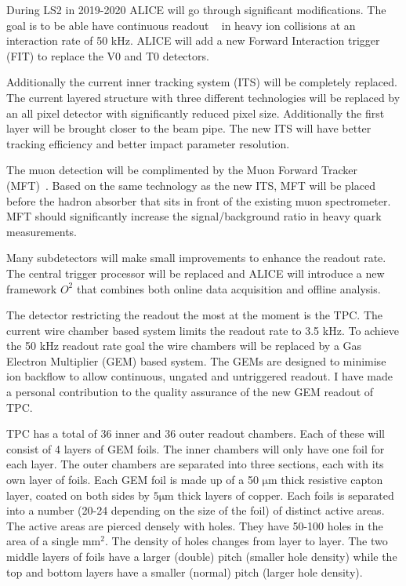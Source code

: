 During LS2 in 2019-2020 ALICE will go through significant modifications. The goal is to be able have continuous readout ~\cite{aliceupgrade} in heavy ion collisions at an interaction rate of 50 kHz. 
ALICE will add a new Forward Interaction trigger (FIT) to replace the V0 and T0 detectors. 

Additionally the current inner tracking system (ITS) will be completely replaced. The current layered structure with three different technologies will be replaced by an all pixel detector with significantly reduced pixel size. Additionally the first layer will be brought closer to the beam pipe. The new ITS will have better tracking efficiency and better impact parameter resolution. 

\setlength{\emergencystretch}{3em}

The muon detection will be complimented by the Muon Forward Tracker (MFT)~\cite{CERN-LHCC-2015-001}. Based on the same technology as the new ITS, MFT will be placed before the hadron absorber that sits in front of the existing muon spectrometer. MFT should significantly increase the signal/background ratio in heavy quark measurements.

Many subdetectors will make small improvements to enhance the readout rate. The central trigger processor will be replaced and ALICE will introduce a new framework $O^2$ that combines both online data acquisition and offline analysis.

The detector restricting the readout the most at the moment is the TPC. The current wire chamber based system  limits the readout rate to 3.5 kHz. To achieve the 50 kHz readout rate goal the wire chambers will be replaced by a Gas Electron Multiplier (GEM) based system. The GEMs are designed to minimise ion backflow to allow continuous, ungated and untriggered readout. I have made a personal contribution to the quality assurance of the new GEM readout of TPC.

TPC has a total of 36 inner and 36 outer readout chambers. Each of these will consist of 4 layers of GEM foils. The inner chambers will only have one foil for each layer. The outer chambers are separated into three sections, each with its own layer of foils. Each GEM foil is made up of a 50 $\mathrm{\mu m}$ thick resistive capton layer, coated on both sides by $5 \mathrm{\mu m}$ thick layers of copper. Each foils is separated into a number (20-24 depending on the size of the foil) of distinct active areas. The active areas are pierced densely with holes. They have 50-100 holes in the area of a single $\mathrm{mm^2}$. The density of holes changes from layer to layer. The two middle layers of foils have a larger (double) pitch (smaller hole density) while the top and bottom layers have a smaller (normal) pitch (larger hole density).

